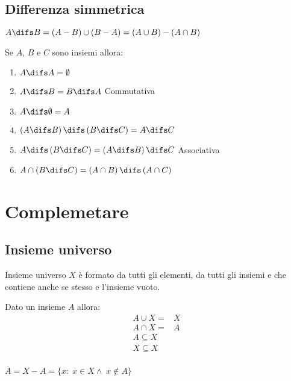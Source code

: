 \section{Differenza simmetrica}
\begin{defn}
	$A\difs B=\left(A-B\right)\cup\left(B-A\right)=\left(A\cup B\right)-\left(A\cap B\right)$
\end{defn}
{\centering
	
\par}
\begin{thm}
	Se $A$, $B$ e $C$ sono insiemi allora:
	\begin{enumerate}
		\item $A\difs A=\emptyset$
		\item $A\difs B=B\difs A$ Commutativa
		\item $A\difs\emptyset=A$
		\item $\left(A\difs B\right)\difs\left(B\difs C\right)=A\difs C$
		\item $A\difs\left(B\difs C\right)=\left(A\difs B\right)\difs C$ Associativa
		\item $A\cap\left(B\difs C\right)=\left(A\cap B\right)\difs\left(A\cap C\right)$
	\end{enumerate}
\end{thm}
\chapter{Complemetare}
\section{Insieme universo}
\begin{defn}
Insieme universo $X$ è formato da tutti gli elementi, da tutti gli insiemi e che contiene anche se stesso e l'insieme vuoto.
\end{defn}
\begin{thm}
Dato un insieme $A$ allora:
\begin{align*}
A\cup X=& X\\
A\cap X=& A\\
A\subseteq X&\\
X\subseteq X&\\
\end{align*}
\end{thm}
\begin{defn}
$\overline{A}=X-A=\lbrace x:\; x\in X\wedge\; x\notin A\rbrace$
\end{defn}
